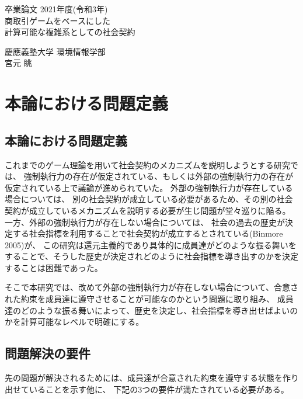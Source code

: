 \documentclass[a4j]{ujreport}
\date{\today}
\def\title{商取引ゲームをベースにした\\計算可能な複雑系としての社会契約}
\def\author{宮元 眺}
\def\dept{慶應義塾大学 環境情報学部}
\begin{document}
\begin{titlepage}
  \begin{center}
    \begin{large}
      卒業論文   2021年度(令和3年)\\
      \vspace{24pt}
      \title
    \end{large}
  \end{center}
  \vspace{40em}
  \begin{flushright}
    \large \dept\\
    \author
  \end{flushright}
\end{titlepage}



\tableofcontents\thispagestyle{plain}



\chapter{本論における問題定義}
\section{本論における問題定義}
これまでのゲーム理論を用いて社会契約のメカニズムを説明しようとする研究では、
強制執行力の存在が仮定されている、もしくは外部の強制執行力の存在が仮定されている上で議論が進められていた。
外部の強制執行力が存在している場合については、
別の社会契約が成立している必要があるため、その別の社会契約が成立しているメカニズムを説明する必要が生じ問題が堂々巡りに陥る。
一方、外部の強制執行力が存在しない場合については、
社会の過去の歴史が決定する社会指標を利用することで社会契約が成立するとされている(Binmore 2005\cite{Binmore 2005})が、
この研究は還元主義的であり具体的に成員達がどのような振る舞いをすることで、そうした歴史が決定されどのように社会指標を導き出すのかを決定することは困難であった。

そこで本研究では、改めて外部の強制執行力が存在しない場合について、合意された約束を成員達に遵守させることが可能なのかという問題に取り組み、
成員達のどのような振る舞いによって、歴史を決定し、社会指標を導き出せばよいのかを計算可能なレベルで明確にする。


\section{問題解決の要件}
先の問題が解決されるためには、成員達が合意された約束を遵守する状態を作り出せていることを示す他に、
下記の3つの要件が満たされている必要がある。
\end{document}
